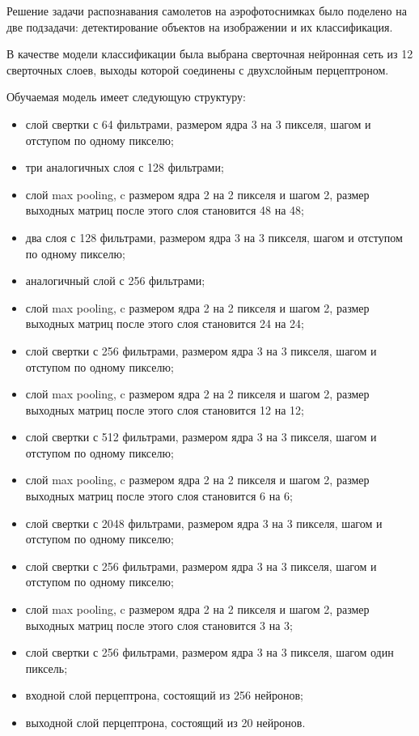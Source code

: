 Решение задачи распознавания самолетов на аэрофотоснимках было поделено на две подзадачи: детектирование объектов на изображении и их классификация.

В качестве модели классификации была выбрана сверточная нейронная сеть из 12 сверточных слоев, выходы которой соединены с двухслойным перцептроном.

Обучаемая модель имеет следующую структуру:
\begin{itemize}
	\item слой свертки с 64 фильтрами, размером ядра 3 на 3 пикселя, шагом и отступом по одному пикселю;
	\item три аналогичных слоя с 128 фильтрами;
	\item слой max pooling, c размером ядра 2 на 2 пикселя и шагом 2, размер выходных матриц после этого слоя становится 48 на 48;
	\item два слоя с 128 фильтрами, размером ядра 3 на 3 пикселя, шагом и отступом по одному пикселю;
	\item аналогичный слой с 256 фильтрами;
	\item слой max pooling, c размером ядра 2 на 2 пикселя и шагом 2, размер выходных матриц после этого слоя становится 24 на 24;
	\item слой свертки с 256 фильтрами, размером ядра 3 на 3 пикселя, шагом и отступом по одному пикселю;
	\item слой max pooling, c размером ядра 2 на 2 пикселя и шагом 2, размер выходных матриц после этого слоя становится 12 на 12;
	\item слой свертки с 512 фильтрами, размером ядра 3 на 3 пикселя, шагом и отступом по одному пикселю;
	\item слой max pooling, c размером ядра 2 на 2 пикселя и шагом 2, размер выходных матриц после этого слоя становится 6 на 6;
	\item слой свертки с 2048 фильтрами, размером ядра 3 на 3 пикселя, шагом и отступом по одному пикселю;
	\item слой свертки с 256 фильтрами, размером ядра 3 на 3 пикселя, шагом и отступом по одному пикселю;
	\item слой max pooling, c размером ядра 2 на 2 пикселя и шагом 2, размер выходных матриц после этого слоя становится 3 на 3;
	\item слой свертки с 256 фильтрами, размером ядра 3 на 3 пикселя, шагом один пиксель;
	\item входной слой перцептрона, состоящий из 256 нейронов;
	\item выходной слой перцептрона, состоящий из 20 нейронов.
\end{itemize}


